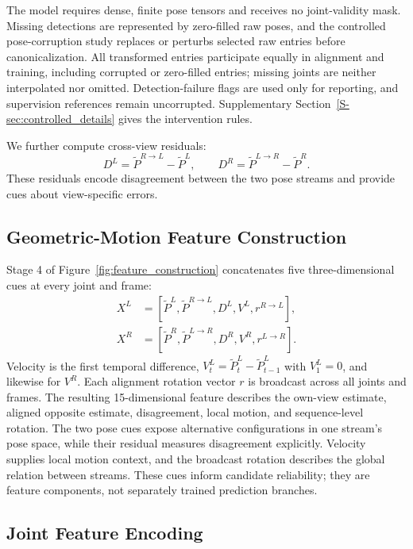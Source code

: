 \documentclass[preprint,12pt]{elsarticle}
\begin{document}
The model requires dense, finite pose tensors and receives no joint-validity mask. Missing detections are represented by zero-filled raw poses, and the controlled pose-corruption study replaces or perturbs selected raw entries before canonicalization. All transformed entries participate equally in alignment and training, including corrupted or zero-filled entries; missing joints are neither interpolated nor omitted. Detection-failure flags are used only for reporting, and supervision references remain uncorrupted. Supplementary Section~\ref{S-sec:controlled_details} gives the intervention rules.

We further compute cross-view residuals:
\[
D^{L} = \tilde{P}^{R \rightarrow L} - \tilde{P}^{L},
\qquad
D^{R} = \tilde{P}^{L \rightarrow R} - \tilde{P}^{R}.
\]
These residuals encode disagreement between the two pose streams and provide cues about view-specific errors.

\subsection{Geometric-Motion Feature Construction}
\label{subsec:feature_construction}

Stage 4 of Figure~\ref{fig:feature_construction} concatenates five three-dimensional cues at every joint and frame:
\[
\begin{aligned}
X^{L}&=[\tilde{P}^{L},\tilde{P}^{R \rightarrow L},D^{L},V^{L},r^{R \rightarrow L}],\\
X^{R}&=[\tilde{P}^{R},\tilde{P}^{L \rightarrow R},D^{R},V^{R},r^{L \rightarrow R}].
\end{aligned}
\]
Velocity is the first temporal difference, \(V^{L}_{t}=\tilde{P}^{L}_{t}-\tilde{P}^{L}_{t-1}\) with \(V^{L}_{1}=0\), and likewise for \(V^R\). Each alignment rotation vector \(r\) is broadcast across all joints and frames. The resulting 15-dimensional feature describes the own-view estimate, aligned opposite estimate, disagreement, local motion, and sequence-level rotation. The two pose cues expose alternative configurations in one stream's pose space, while their residual measures disagreement explicitly. Velocity supplies local motion context, and the broadcast rotation describes the global relation between streams. These cues inform candidate reliability; they are feature components, not separately trained prediction branches.

\subsection{Joint Feature Encoding}
\label{subsec:joint_feature_encoding}
\end{document}
